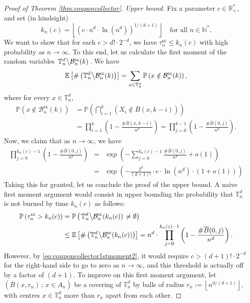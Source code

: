 \documentclass[10pt,a4paper]{amsart}
\theoremstyle{plain}
\theoremstyle{remark}
\begin{document}
\begin{proof}[Proof of Theorem \ref{thm:couponcollector}]
\emph{Upper bound.}
Fix a parameter $c\in\mathbb{R}_+^*$, and set (in hindsight)
\[k_n(c)=\left\lfloor\left(c\cdot n^d\cdot\ln\left(n^d\right)\right)^{1/(d+1)}\right\rfloor\quad\text{for all $n\in\mathbb{N}^*$.}\]
We want to show that for each $c>d!\cdot2^{-d}$, we have $\tau_n^\mathsf{cc}\leq k_n (c)$ with high probability as $n\to\infty$.
To this end, let us calculate the first moment of the random variables $\left.\mathbb{T}_n^d\middle\backslash\mathcal{B}_n^\mathsf{cc}(k)\right.$.
We have
\[\mathbb{E}\left[\#\left(\mathbb{T}_n^d\middle\backslash\mathcal{B}_n^\mathsf{cc}(k)\right)\right]=\sum_{x\in\mathbb{T}_n^d}\mathbb{P}\left(x\notin\mathcal{B}_n^\mathsf{cc}(k)\right),\]
where for every $x\in\mathbb{T}_n^d$,
\[\begin{split}
\mathbb{P}\left(x\notin\mathcal{B}_n^\mathsf{cc}(k)\right)&=\mathbb{P}\left(\bigcap_{i=1}^k\left(X_i\notin\overline{B}(x,k-i)\right)\right)\\
&=\prod_{i=1}^k\left(1-\frac{\#\overline{B}(x,k-i)}{n^d}\right)=\prod_{j=0}^{k-1}\left(1-\frac{\#\overline{B}(0,j)}{n^d}\right).
\end{split}\]
Now, we claim that as $n\to\infty$, we have
\begin{eqnarray}
\prod_{j=0}^{k_n(c)-1}\left(1-\frac{\#\overline{B}(0,j)}{n^d}\right)&=&\exp\left(-\sum_{j=0}^{k_n(c)-1}\frac{\#\overline{B}(0,j)}{n^d}+o(1)\right)\label{eq:couponcollector1stmoment1}\\
&=&\exp\left(-\frac{2^d}{(d+1)!}\cdot c\cdot\ln\left(n^d\right)\cdot(1+o(1))\right)\label{eq:couponcollector1stmoment2}
\end{eqnarray}
Taking this for granted, let us conclude the proof of the upper bound.
A naive first moment argument would consist in upper bounding the probability that $\mathbb{T}_n^d$ is not burned by time $k_n(c)$ as follows:
\[\begin{split}
\mathbb{P}\left(\tau_n^\mathsf{cc}>k_n(c)\right)&=\mathbb{P}\left(\left.\mathbb{T}_n^d\middle\backslash\mathcal{B}_n^\mathsf{cc}(k_n(c))\right.\neq\emptyset\right)\\
&\leq\mathbb{E}\left[\#\left(\mathbb{T}_n^d\middle\backslash\mathcal{B}_n^\mathsf{cc}(k_n(c))\right)\right]=n^d\cdot\prod_{j=0}^{k_n(c)-1}\left(1-\frac{\#\overline{B}(0,j)}{n^d}\right).
\end{split}\]
However, by \eqref{eq:couponcollector1stmoment2}, it would require $c>(d+1)!\cdot2^{-d}$ for the right-hand side to go to zero as $n\to\infty$, and this threshold is actually off by a factor of $(d+1)$.
To improve on this first moment argument, let $\left(\overline{B}(x,r_n)\,;\,x\in A_n\right)$ be a covering of $\mathbb{T}_n^d$ by balls of radius $r_n:=\left\lfloor n^{d/(d+1)}\right\rfloor$, with centres $x\in\mathbb{T}_n^d$ more than $r_n$ apart from each other.

\end{proof}
\end{document}
